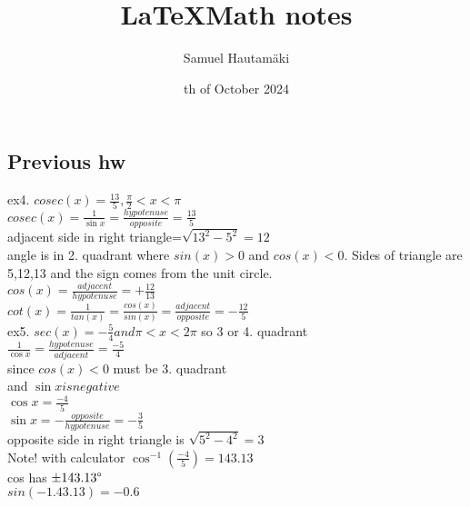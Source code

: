 \documentclass{article}
\title{\LaTeX Math notes}
\author{Samuel Hautamäki}
\date{th of October 2024}
\begin{document}
  \maketitle
  
  \subsection{Previous hw}
  ex4. $cosec (x)=\frac{13}{5}, \frac{\pi}{2}<x<\pi$\\
  $cosec(x)=\frac{1}{\sin x}=\frac{hypotenuse}{opposite}=\frac{13}{5}$\\
  adjacent side in right triangle=$\sqrt{13^2-5^2}=12$\\
  angle is in 2. quadrant where $sin(x)>0$ and $cos(x)<0$. Sides of triangle are 5,12,13 and the sign comes from the unit circle.\\
  $cos(x)=\frac{adjacent}{hypotenuse}=+\frac{12}{13}$\\
  $cot(x)=\frac{1}{tan(x)}=\frac{cos(x)}{sin(x)}=\frac{adjacent}{opposite}=-\frac{12}{5}$\\
  ex5. $sec(x)=-\frac{5}{4} and \pi<x<2\pi$ so 3 or 4. quadrant \\
  $\frac{1}{\cos x}=\frac{hypotenuse}{adjacent}=\frac{-5}{4}$\\
  since $cos(x)<0$ must be 3. quadrant\\
  and $\sin x is negative$\\
  $\cos x=\frac{-4}{5}$\\
  $\sin x=-\frac{opposite}{hypotenuse}=-\frac{3}{5}$\\
  opposite side in right triangle is $\sqrt{5^2-4^2}=3$\\
  Note! with calculator $\cos^{-1}(\frac{-4}{5})=143.13$\\
  cos has $\pm143.13\degree$\\
  $sin(-1.43.13)=-0.6$\\
\end{document}

